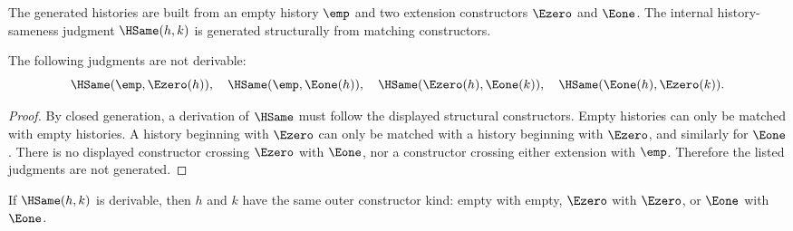 \begin{definition}
The generated histories are built from an empty history \(\emp\) and two extension constructors \(\Ezero\) and \(\Eone\). The internal history-sameness judgment \(\HSame(h,k)\) is generated structurally from matching constructors.
\end{definition}

\begin{theorem}
\label{thm:history-no-confusion}
The following judgments are not derivable:
$$
\HSame(\emp,\Ezero(h)),\quad
\HSame(\emp,\Eone(h)),\quad
\HSame(\Ezero(h),\Eone(k)),\quad
\HSame(\Eone(h),\Ezero(k)).
$$
\end{theorem}
\begin{proof}
By closed generation, a derivation of \(\HSame\) must follow the displayed structural constructors. Empty histories can only be matched with empty histories. A history beginning with \(\Ezero\) can only be matched with a history beginning with \(\Ezero\), and similarly for \(\Eone\). There is no displayed constructor crossing \(\Ezero\) with \(\Eone\), nor a constructor crossing either extension with \(\emp\). Therefore the listed judgments are not generated.
\end{proof}

\begin{theorem}
\label{thm:history-constructor-kind-preserved}
If \(\HSame(h,k)\) is derivable, then \(h\) and \(k\) have the same outer constructor kind: empty with empty, \(\Ezero\) with \(\Ezero\), or \(\Eone\) with \(\Eone\).
\end{theorem}


